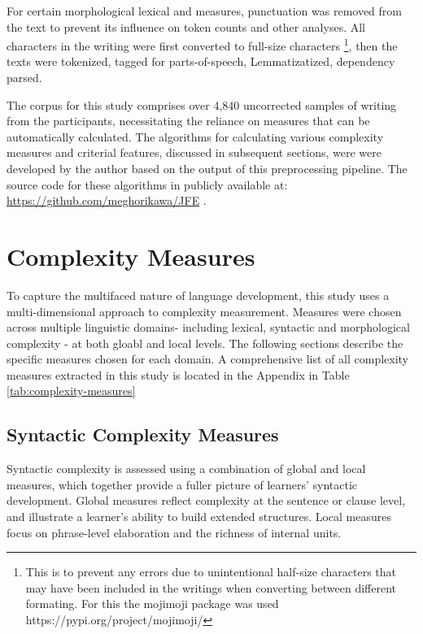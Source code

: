 For certain morphological lexical and measures, punctuation was removed from the text to prevent its influence on
token counts and other analyses. All characters in the writing were first converted to full-size characters \footnote{This is to prevent any errors due to unintentional half-size characters that may have been included in the writings when converting between different formating. For this the mojimoji package was used https://pypi.org/project/mojimoji/}, then
the texts were tokenized, tagged for parts-of-speech,
Lemmatizatized, dependency parsed.

The corpus for this study comprises over 4,840 uncorrected samples of writing from the participants, necessitating
the reliance on measures that can be automatically calculated.
 The algorithms for calculating various complexity measures and criterial features, discussed in subsequent
sections, were
were developed by the author based on the output of this preprocessing pipeline. The source code for these
algorithms in publicly available at: \href{https://github.com/meghorikawa/JFE}{https://github.com/meghorikawa/JFE} .

\section{Complexity Measures}
To capture the multifaced nature of language development, this study uses a multi-dimensional approach to complexity
measurement. Measures were chosen across multiple linguistic domains- including lexical, syntactic and morphological
complexity - at both gloabl and local levels. The following sections describe the specific measures chosen for each
domain. A comprehensive list of all complexity measures extracted in this study is located in the Appendix in
Table \ref{tab:complexity-measures}

\subsection{Syntactic Complexity Measures}
Syntactic complexity is assessed using a combination of global and local measures, which together provide a fuller
picture of learners' syntactic development. Global measures reflect complexity at the sentence or clause level,
and illustrate a learner's ability to build extended structures. Local measures focus on phrase-level elaboration
and the richness of internal units.

